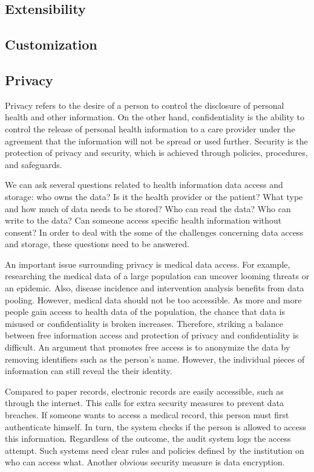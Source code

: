     \subsection{Extensibility}

    \subsection{Customization}

    \subsection{Privacy}\label{2_privacy}

    Privacy refers to the desire of a person to control the disclosure of personal health and other information\cite{biomedical_informatics}. On the other hand, confidentiality is the ability to control the release of personal health information to a care provider under the agreement that the information will not be spread or used further. Security is the protection of privacy and security, which is achieved through policies, procedures, and safeguards.

    We can ask several questions related to health information data access and storage: who owns the data? Is it the health provider or the patient? What type and how much of data needs to be stored? Who can read the data? Who can write to the data? Can someone access specific health information without consent? In order to deal with the some of the challenges concerning data access and storage, these questions need to be answered\cite{meingast2006security}.

    An important issue surrounding privacy is medical data access. For example, researching the medical data of a large population can uncover looming threats or an epidemic. Also, disease incidence and intervention analysis benefits from data pooling. However, medical data should not be too accessible. As more and more people gain access to health data of the population, the chance that data is misused or confidentiality is broken increases. Therefore, striking a balance between free information access and protection of privacy and confidentiality is difficult. An argument that promotes free access is to anonymize the data by removing identifiers such as the person's name. However, the individual pieces of information can still reveal the their identity.

    Compared to paper records, electronic records are easily accessible, such as through the internet. This calls for extra security measures to prevent data breaches. If someone wants to access a medical record, this person must first authenticate himself. In turn, the system checks if the person is allowed to access this information. Regardless of the outcome, the audit system logs the access attempt. Such systems need clear rules and policies defined by the institution on who can access what. Another obvious security measure is data encryption.

